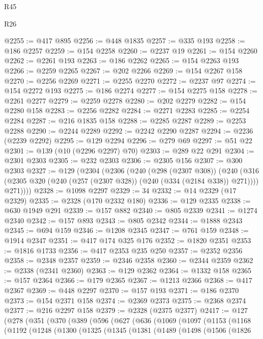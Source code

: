 \begin{lexlean}{R45}
\begin{lexlean}{R26}
\begin{coremodule}
{{{{{{{{{{{{{{{{{{{{{{{{{{{{{{{{{{{{{{{{{{{{{{{{{{{{{{{{{{{{{{{{{{{{{{{{@2255 := @417 @895
@2256 := @448 @1835
@2257 := @335 @193
@2258 := @186 @2257
@2259 := @154 @2258
@2260 := @2237 @19
@2261 := @154 @2260
@2262 := @2261 @193
@2263 := @186 @2262
@2265 := @154 @2263 @193
@2266 := @2259 @2265
@2267 := @202 @2266
@2269 := @154 @2267 @158
@2270 := @2256 @2269
@2271 := @2255 @2270
@2272 := @2237 @97
@2274 := @154 @2272 @193
@2275 := @186 @2274
@2277 := @154 @2275 @158
@2278 := @2261 @2277
@2279 := @2259 @2278
@2280 := @202 @2279
@2282 := @154 @2280 @158
@2283 := @2256 @2282
@2284 := @2271 @2283
@2285 := @2254 @2284
@2287 := @216 @1835 @158
@2288 := @2285 @2287
@2289 := @2253 @2288
@2290 := @2244 @2289
@2292 := @2242 @2290 @2287
@2294 := @2236 (@2239 @2292)
@2295 := @129 @2294
@2296 := @279 @69
@2297 := @51 @22
@2301 := @139 (@10 (@2296 @2297) @70)
@2303 := @289 @22 @291
@2304 := @2301 @2303
@2305 := @232 @2303
@2306 := @2305 @156
@2307 := @300 @2303
@2327 := @129
    (@2304
      (@2306
        (@240
          (@298 (@2307 @308))
          (@240
            (@316 (@2305 @320 (@240 (@257 (@2307 @328)) (@240 (@334 (@2184 @338)) @271))))
            @271))))
@2328 := @1098 @2297
@2329 := 34
@2332 := @14 @2329 (@17 @2329)
@2335 := @2328 (@170 @2332 @180)
@2336 := @129 @2335
@2338 := @630 @1949 @291
@2339 := @157 @882
@2340 := @805 @2339
@2341 := @1274 @2340
@2342 := @157 @893
@2343 := @805 @2342
@2344 := @1888 @2343
@2345 := @694 @159
@2346 := @1208 @2345
@2347 := @761 @159
@2348 := @1914 @2347
@2351 := @417 @174 @325 @176
@2352 := @1820 @2351
@2353 := @1816 @1733
@2356 := @417 @2353 @235 @250
@2357 := @2352 @2356
@2358 := @2348 @2357
@2359 := @2346 @2358
@2360 := @2344 @2359
@2362 := @2338 (@2341 @2360)
@2363 := @129 @2362
@2364 := @1332 @158
@2365 := @157 @2364
@2366 := @179 @2365
@2367 := @1213 @2366
@2368 := @417 @2367
@2369 := @448 @2297
@2370 := @157 @193
@2371 := @186 @2370
@2373 := @154 @2371 @158
@2374 := @2369 @2373
@2375 := @2368 @2374
@2377 := @216 @2297 @158
@2379 := @2328 (@2375 @2377)
@2417 := @127
    (@278
      (@351
        (@370
          (@389
            (@596
              (@627
                (@636
                  (@1069
                    (@1097
                      (@1153
                        (@1168
                          (@1192
                            (@1248
                              (@1300
                                (@1325
                                  (@1345
                                    (@1381
                                      (@1489
                                        (@1498
                                          (@1506
                                            (@1826
}}}}}}}}}}}}}}}}}}}}}}}}}}}}}}}}}}}}}}}}}}}}}}}}}}}}}}}}}}}}}}}}}}}}}}}}
\end{coremodule}
\end{lexlean}
\end{lexlean}
